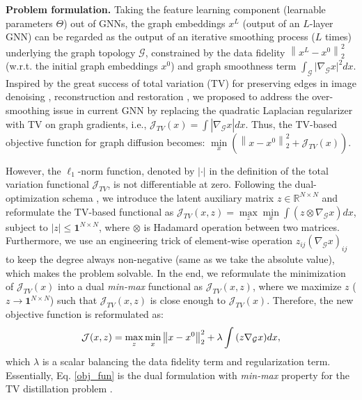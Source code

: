 \documentclass{article}
\begin{document}
\textbf{Problem formulation.} Taking the feature learning component (learnable parameters $\Theta$) out of GNNs, the graph embeddings $x^{L}$ (output of an $L$-layer GNN) can be regarded as the output of an iterative smoothing process ($L$ times) underlying the graph topology $\mathcal{G}$, constrained by the data fidelity $\left\| {x^{L} - x^{0}} \right\|_2^2$ (w.r.t. the initial graph embeddings $x^{0}$) and graph smoothness term $\mathop \int_\mathcal{G}  | \nabla_{\mathcal{G}} x{|^2}dx$.
Inspired by the great success of total variation (TV) for preserving edges in image denoising \cite{rudin1992nonlinear}, reconstruction \cite{wang2008new} and restoration \cite{chan2006total}, we proposed to address the over-smoothing issue in current GNN by replacing the quadratic Laplacian regularizer with TV on graph gradients, i.e., $\mathcal{J}_{TV}(x) = \mathop \int|\nabla_\mathcal{G} x| dx$.
Thus, the TV-based objective function for graph diffusion becomes: $\mathop {\min }\limits_x (\left\| {x - x^{0}} \right\|_2^2 + \mathcal{J}_{TV}(x))$.

However, the ${\ell _1}$-norm function, denoted by $|\cdot|$ in the definition of the total variation functional $\mathcal{J}_{TV}$, is not differentiable at zero. Following the dual-optimization schema \cite{beck2009fast,chambolle2011first}, we introduce the latent auxiliary matrix $z\in \mathbb{R}^{N\times N}$ and reformulate the TV-based functional as $\mathcal{J}_{TV}(x, z) = \mathop {\max}\limits_z \mathop {\min }\limits_x \int(z \otimes \nabla_\mathcal{G} x) dx$, subject to $|z| \le \mathbf{1}^{N \times N}$, where $\otimes$ is Hadamard operation between two matrices.
Furthermore, we use an engineering trick of element-wise operation $z_{ij}(\nabla_\mathcal{G} x)_{ij}$ to keep the degree always non-negative (same as we take the absolute value), which makes the problem solvable.  %
In the end, we reformulate the minimization of $\mathcal{J}_{TV}(x)$ into a dual \textit{min-max} functional as $\mathcal{J}_{TV}(x,z)$, where we maximize $z$ ($z\rightarrow \mathbf{1}^{N\times N}$) such that $\mathcal{J}_{TV}(x,z)$ is close enough to $\mathcal{J}_{TV}(x)$.
Therefore, the new objective function is reformulated as:
\begin{equation}
\label{obj_fun}
{\cal J}(x,z) = \mathop {\max }\limits_z \mathop {\min }\limits_x \left\| {x - {x^0}} \right\|_2^2 + \lambda \int {(z{\nabla _{\cal \mathcal{G}}}x} )dx,
\end{equation}
which $\lambda$ is a scalar balancing the data fidelity term and regularization term. Essentially, Eq. \ref{obj_fun} is the dual formulation with \textit{min-max} property for the TV distillation problem \cite{zhu2010duality}.
\end{document}
